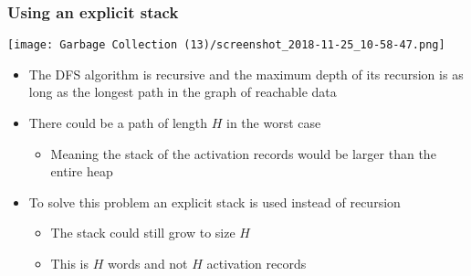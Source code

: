 \documentclass[11pt]{article}
\begin{document}
\subsubsection{Using an explicit stack}
\label{sec:orge551efb}
\begin{center}
\texttt{[image: Garbage Collection (13)/screenshot\_2018-11-25\_10-58-47.png]}
\end{center}
\begin{itemize}
\item The DFS algorithm is recursive and the maximum depth of its recursion is as long as the longest path in the graph of reachable data
\item There could be a path of length \(H\) in the worst case
\begin{itemize}
\item Meaning the stack of the activation records would be larger than the entire heap
\end{itemize}
\item To solve this problem an explicit stack is used instead of recursion
\begin{itemize}
\item The stack could still grow to size \(H\)
\item This is \(H\) words and not \(H\) activation records
\end{itemize}
\end{itemize}
\end{document}
